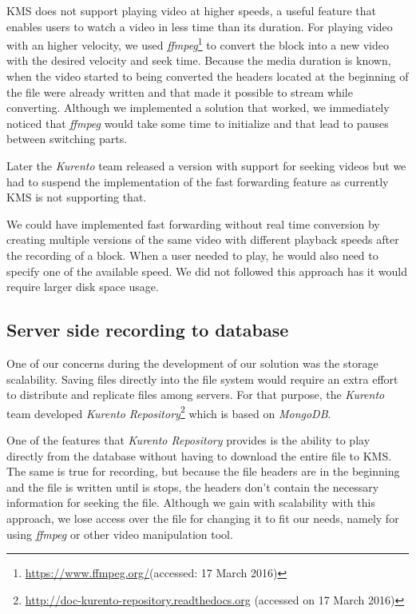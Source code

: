         \ac{KMS} does not support playing video at higher speeds, a useful feature that enables users to watch a video in less time than its duration.
	For playing video with an higher velocity, we used \emph{ffmpeg}\footnote{\url{https://www.ffmpeg.org/}(accessed: 17 March 2016)} to convert the block into a new video with the desired velocity and seek time. Because the media duration is known, when the video started to being converted the headers located at the beginning of the file were already written and that made it possible to stream while converting.
	Although we implemented a solution that worked, we immediately noticed that \emph{ffmpeg} would take some time to initialize and that lead to pauses between switching parts.
        
	Later the \emph{Kurento} team released a version with support for seeking videos but we had to suspend the implementation of the fast forwarding feature as currently \ac{KMS} is not supporting that.

	We could have implemented fast forwarding without real time conversion by creating multiple versions of the same video with different playback speeds after the recording of a block. When a user needed to play, he would also need to specify one of the available speed. We did not followed this approach has it would require larger disk space usage. 

\subsection{Server side recording to database}

	One of our concerns during the development of our solution was the storage scalability. Saving files directly into the file system would require an extra effort to distribute and replicate files among servers. For that purpose, the \emph{Kurento} team developed \emph{Kurento Repository}\footnote{\url{http://doc-kurento-repository.readthedocs.org} (accessed on 17 March 2016)} which is based on \emph{MongoDB}.

	One of the features that \emph{Kurento Repository} provides is the ability to play directly from the database without having to download the entire file to \ac{KMS}. The same is true for recording, but because the file headers are in the beginning and the file is written until is stops, the headers don't contain the necessary information for seeking the file.
	Although we gain with scalability with this approach, we lose access over the file for changing it to fit our needs, namely for using \emph{ffmpeg} or other video manipulation tool.
        
